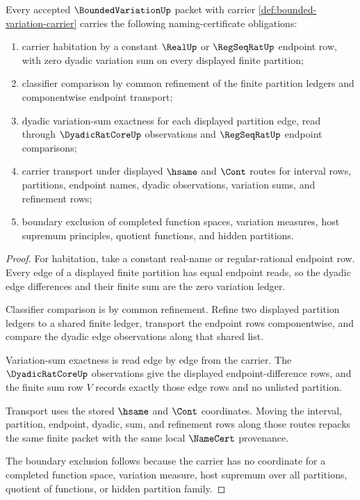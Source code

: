 \begin{theorem}
\label{thm:bounded-variation-namecert-obligations}
Every accepted $\BoundedVariationUp$ packet with carrier \autoref{def:bounded-variation-carrier} carries the following naming-certificate obligations:
\begin{enumerate}
\item carrier habitation by a constant $\RealUp$ or $\RegSeqRatUp$ endpoint row, with zero dyadic variation sum on every displayed finite partition;
\item classifier comparison by common refinement of the finite partition ledgers and componentwise endpoint transport;
\item dyadic variation-sum exactness for each displayed partition edge, read through $\DyadicRatCoreUp$ observations and $\RegSeqRatUp$ endpoint comparisons;
\item carrier transport under displayed $\hsame$ and $\Cont$ routes for interval rows, partitions, endpoint names, dyadic observations, variation sums, and refinement rows;
\item boundary exclusion of completed function spaces, variation measures, host supremum principles, quotient functions, and hidden partitions.
\end{enumerate}
\end{theorem}
\begin{proof}
For habitation, take a constant real-name or regular-rational endpoint row. Every edge of a displayed finite partition has equal endpoint reads, so the dyadic edge differences and their finite sum are the zero variation ledger.

Classifier comparison is by common refinement. Refine two displayed partition ledgers to a shared finite ledger, transport the endpoint rows componentwise, and compare the dyadic edge observations along that shared list.

Variation-sum exactness is read edge by edge from the carrier. The $\DyadicRatCoreUp$ observations give the displayed endpoint-difference rows, and the finite sum row $V$ records exactly those edge rows and no unlisted partition.

Transport uses the stored $\hsame$ and $\Cont$ coordinates. Moving the interval, partition, endpoint, dyadic, sum, and refinement rows along those routes repacks the same finite packet with the same local $\NameCert$ provenance.

The boundary exclusion follows because the carrier has no coordinate for a completed function space, variation measure, host supremum over all partitions, quotient of functions, or hidden partition family.
\end{proof}

